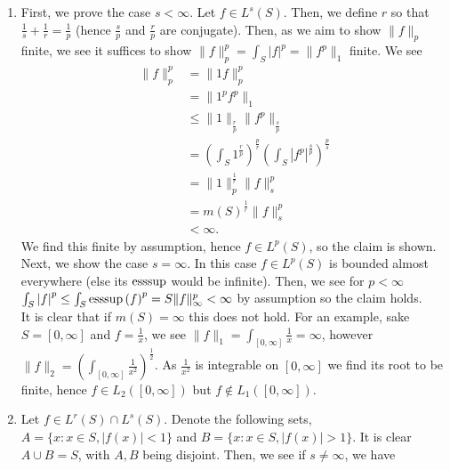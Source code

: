 \documentclass[a4paper]{article}
\begin{document}
\begin{problem}[42]
\begin{enumerate}
	\item First, we prove the case \(s < \infty\). Let \(f \in L^{s}\left( S \right) \). Then, we define \(r\) so that \(\frac{1}{s} + \frac{1}{r} = \frac{1}{p}\) (hence \(\frac{s}{p}\) and \(\frac{r}{p}\) are conjugate). Then, as we aim to show \(\|f\|_{p}\) finite, we see it suffices to show \(\|f\|_{p}^{p} = \int_{S} \left| f \right| ^{p} = \| f^{p}\|_{1}\) finite. We see
		\begin{align*}
			\|f\|_{p}^{p} &= \| 1f\|_{p}^{p}\\
&= \| 1^{p} f^{p}\|_{1} \\
&\le \|1\|_{\frac{r}{p}} \|f^{p}\|_{\frac{s}{p}}\\
&= (\int_{S} 1^{\frac{r}{p}} )^{\frac{p}{r}} \left( \int_{S} \left| f^{p} \right| ^{\frac{s}{p}} \right) ^{\frac{p}{s}}  \\
&= \|1\|^{\frac{1}{r}}_{p} \|f\|_{s}^{p}\\
&= m\left( S \right) ^{\frac{1}{r}} \|f\|_{s}^{p} \\
&< \infty
		.\end{align*}
		We find this finite by assumption, hence \(f \in L^{p}\left( S \right) \), so the claim is shown. \\
		Next, we show the case \(s = \infty\). In this case \(f\in L^{p}\left( S \right) \) is bounded almost everywhere (else its \(\operatorname{esssup}\) would be infinite). Then, we see for \(p < \infty\) \(\int_{S} \left| f \right| ^{p} \le \int_{S}\operatorname{esssup}\left( f \right)^{p} = S \|f\|_{\infty}^{p} < \infty\) by assumption so the claim holds.\\
		It is clear that if \(m\left( S \right) = \infty\) this does not hold. For an example, sake \(S = \left[ 0, \infty \right] \) and \(f = \frac{1}{x}\), we see \(\|f\|_{1} = \int_{\left[ 0, \infty \right] } \frac{1}{x} = \infty\), however \(\|f\|_{2} = (\int_{\left[ 0, \infty \right] } \frac{1}{x^2})^{\frac{1}{2}}\). As \(\frac{1}{x^2}\) is integrable on \(\left[ 0, \infty \right] \) we find its root to be finite, hence \(f \in L_2\left( \left[ 0, \infty \right]  \right) \) but \(f \not\in L_1\left( \left[ 0, \infty \right]  \right) \).
	\item Let \(f \in L^{r}\left( S \right) \cap L^{s}\left( S \right) \). Denote the following sets, \(A = \{x  : x \in S, \left| f\left( x \right)  \right| < 1\} \) and \(B = \{x : x \in S, \left| f\left( x \right)  \right| > 1\} \). It is clear \(A \cup B = S\), with \(A, B\) being disjoint. Then, we see if \(s \neq \infty\), we have

\end{enumerate}
\end{problem}
\end{document}
